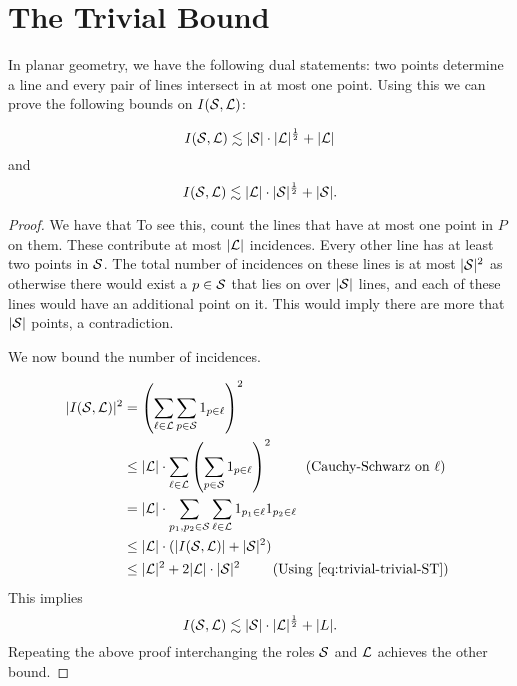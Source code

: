 \section{The Trivial Bound}
In planar geometry, we have the following dual statements: two points determine a line and every pair of lines intersect in at most one point.
Using this we can prove the following bounds on $I(\mathcal S,\mathcal L)$:
\begin{theorem}
    $$I(\mathcal S,\mathcal L) \lesssim |\mathcal S|\cdot |\mathcal L|^{\frac{1}{2}} + |\mathcal L|$$
    and
    $$I(\mathcal S,\mathcal L) \lesssim |\mathcal L|\cdot |\mathcal S|^{\frac{1}{2}} + |\mathcal S|.$$
    \label{thm:trivial-ST-bounds}
\end{theorem}
\begin{proof}
    

We have that 
To see this, count the lines that have at most one point in $P$ on them. These contribute at most $|\mathcal L|$ incidences.
Every other line has at least two points in $\mathcal S$. The total number of incidences on these lines is at most $|\mathcal S|^2$
as otherwise there would exist a $p\in \mathcal S$ that lies on over $|\mathcal S|$ lines, and each of these lines would have an additional 
point on it. This would imply there are more that $|\mathcal S|$ points, a contradiction. 

We now bound the number of incidences. 

\begin{align*}
    |I(\mathcal S,\mathcal L)|^2 &= \left( \sum_{\ell \in \mathcal L} \sum_{p \in \mathcal S} 1_{p\in \ell} \right)^2 \\
    & \leq |\mathcal L|\cdot \sum_{\ell \in \mathcal L} \left( \sum_{p \in \mathcal S} 1_{p\in \ell} \right)^2  \qquad \text{ (Cauchy-Schwarz on $\ell$)}\\
    &= |\mathcal L|\cdot \sum_{p_1,p_2 \in \mathcal S} \sum_{\ell \in \mathcal L}   1_{p_1\in \ell} 1_{p_2\in \ell}    \\
    & \leq |\mathcal L|\cdot ( |I(\mathcal S,\mathcal L)| + |\mathcal S|^2)\\
    &\leq |\mathcal L|^2 + 2|\mathcal L|\cdot |\mathcal S|^2 \qquad \text{ (Using \ref{eq:trivial-trivial-ST}) }\\ 
\end{align*}    
This implies
$$I(\mathcal S,\mathcal L) \lesssim |\mathcal S|\cdot |\mathcal L|^{\frac{1}{2}} + |L|.$$ 
Repeating the above proof interchanging the roles $\mathcal S$ and $\mathcal L$ achieves the other bound.
\end{proof}


